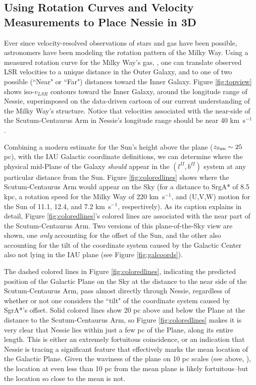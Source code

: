 \subsection{Using Rotation Curves and Velocity Measurements to Place Nessie in 3D}

Ever since velocity-resolved observations of stars and gas have been possible, astronomers have been modeling the rotation pattern of the Milky Way.   Using a measured rotation curve for the Milky Way's gas, \citep[e.g.][ ]{McClureGriffiths2007}, one can translate observed LSR velocities to a unique distance in the Outer Galaxy, and to one of two possible (``Near" or ``Far") distances toward the Inner Galaxy.   Figure \ref{fig:topview} shows iso-$v_{LSR}$ contours toward the Inner Galaxy, around the longitude range of Nessie, superimposed on the data-driven cartoon of our current understanding of the Milky Way's structure.  Notice that velocities associated with the near-side of the Scutum-Centaurus Arm in Nessie's longitude range should be near 40 km\ s$^{-1}$.

Combining a modern estimate for the Sun's height above the plane ($z_{\rm Sun}\sim 25$ pc), with the IAU Galactic coordinate definitions, we can determine where the physical mid-Plane of the Galaxy \textit{should} appear in the $(l^{II}, b^{II})$ system at any particular distance from the Sun.  Figure \ref{fig:coloredlines} shows where the Scutum-Centaurus Arm would appear on the Sky (for a distance to SrgA* of 8.5 kpc, a rotation speed for the Milky Way of 220 km\ s$^{-1}$, and (U,V,W) motion for the Sun of 11.1, 12.4, and 7.2 km\ s$^{-1}$, respectively).   As its caption explains in detail, Figure \ref{fig:coloredlines}'s colored lines are associated with the near part of the Scutum-Centaurus Arm. Two versions of this plane-of-the-Sky view are shown, one \textit{only} accounting for the offset of the Sun, and the other also accounting for the tilt of the coordinate system caused by the Galactic Center also not lying in the IAU plane (see Figure \ref{fig:galcoords}). 

The dashed colored lines in Figure \ref{fig:coloredlines}, indicating the predicted position of the Galactic Plane on the Sky at the distance to the near side of the Scutum-Centaurus Arm, pass almost directly through Nessie, regardless of whether or not one considers the ``tilt" of the coordinate system caused by SgrA*'s offset.  Solid colored lines show 20 pc above and below the Plane at the distance to the Scutum-Centaurus Arm, so Figure \ref{fig:coloredlines} makes it is very clear that Nessie lies within just a few pc of the Plane, along its entire length. This is either an extremely fortuitous coincidence, or an indication that Nessie is tracing a significant feature that effectively marks the mean location of the Galactic Plane.  Given the waviness of the plane on 10 pc scales (see above, \citep{Malhotra1994}), the location at even less than 10 pc from the mean plane is likely fortuitous--but the location so close to the mean is not.